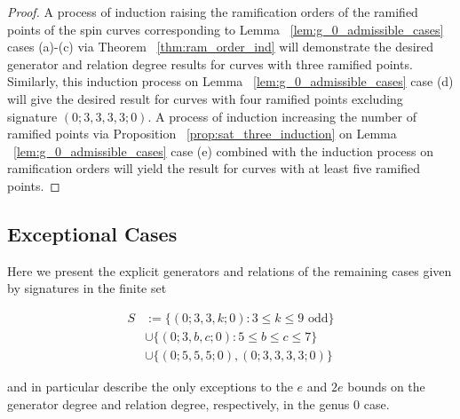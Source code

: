 \documentclass{amsart}
\theoremstyle{plain}
\theoremstyle{definition}
\theoremstyle{remark}
\numberwithin{equation}{section}
\newcommand\ssec{\subsection}
\begin{document}
\begin{proof}
A process of induction raising the ramification orders of
the ramified points of the spin curves corresponding to Lemma
~\ref{lem:g_0_admissible_cases} cases (a)-(c) via Theorem
~\ref{thm:ram_order_ind} will demonstrate the desired generator and
relation degree results for curves with three ramified points.
Similarly, this induction process on Lemma
~\ref{lem:g_0_admissible_cases} case (d) will give the desired
result for curves with four ramified points excluding signature
$(0; 3, 3, 3, 3; 0)$. A process of induction increasing the
number of ramified points via Proposition
~\ref{prop:sat_three_induction} on Lemma ~\ref{lem:g_0_admissible_cases}
case (e) combined with the induction process on ramification orders
will yield the result for curves with at least five ramified points.
\end{proof}

\ssec{Exceptional Cases}
\label{ssec:g_0_exceptional}
Here we present the explicit generators and relations of the remaining
cases given by signatures in the finite set

\begin{align*}
	S &:= \{(0; 3, 3, k; 0) : 3 \leq k \leq 9 \text{ odd}\} \\
		&\cup \{(0; 3, b, c; 0) : 5 \leq b \leq c \leq 7\} \\
		&\cup \{(0; 5, 5, 5; 0), (0; 3, 3, 3, 3; 0)\}
\end{align*}

\noindent
and in particular describe the only exceptions to the $e$ and $2e$
bounds on the generator degree and relation degree, respectively,
in the genus 0 case.
\end{document}
